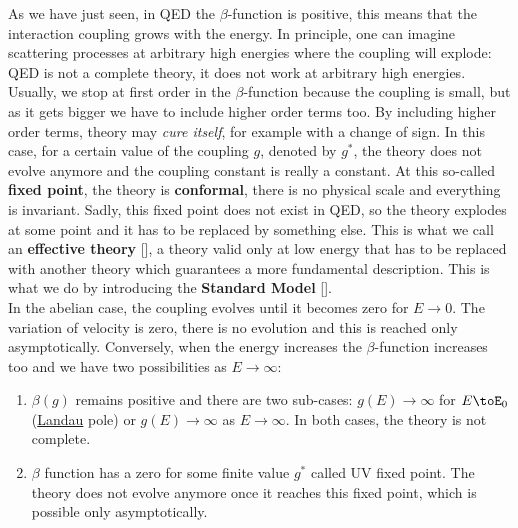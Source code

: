 \documentclass[../main.tex]{subfiles}
\begin{document}
\begin{example}
\end{example}
As we have just seen, in QED the $\beta$-function is positive, this means that the interaction coupling grows with the energy. In principle, one can imagine scattering processes at arbitrary high energies where the coupling will explode: QED is not a complete theory, it does not work at arbitrary high energies.\\
Usually, we stop at first order in the $\beta$-function because the coupling is small, but as it gets bigger we have to include higher order terms too. By including higher order terms, theory may \textit{cure itself}, for example with a change of sign. In this case, for a certain value of the coupling $g$, denoted by $g^*$, the theory does not evolve anymore and the coupling constant is really a constant. At this so-called \textbf{fixed point}, the theory is \textbf{conformal}, there is no physical scale and everything is invariant. Sadly, this fixed point does not exist in QED, so the theory explodes at some point and it has to be replaced by something else. This is what we call an \textbf{effective theory} [], a theory valid only at low energy that has to be replaced with another theory which guarantees a more fundamental description. This is what we do by introducing the \textbf{Standard Model} [].\\
In the abelian case, the coupling evolves until it becomes zero for $E\to0$. The variation of velocity is zero, there is no evolution and this is reached only asymptotically. Conversely, when the energy increases the $\beta$-function increases too and we have two possibilities as $E\to\infty$: 
\begin{enumerate}
    \item $\beta(g)$ remains positive and there are two sub-cases: $g(E)\to\infty$ for $E\toE_0$ (\href{https://en.wikipedia.org/wiki/Lev_Landau}{Landau} pole) or $g(E)\to\infty$ as $E\to\infty$. In both cases, the theory is not complete.
    \item $\beta$ function has a zero for some finite value $g^*$ called UV fixed point. The theory does not evolve anymore once it reaches this fixed point, which is possible only asymptotically.
\end{enumerate}
\end{document}

